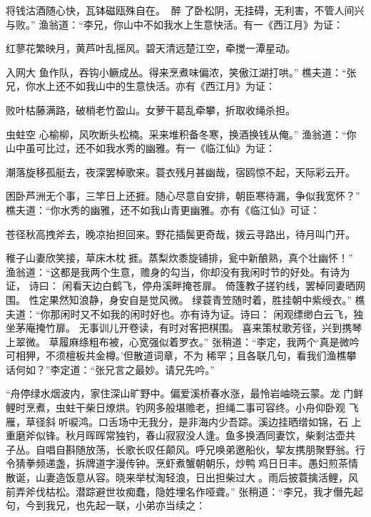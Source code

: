 将钱沽酒随心快，瓦钵磁瓯殊自在。醉
了卧松阴，无挂碍，无利害，不管人间兴与败。”
渔翁道：“李兄，你山中不如我水上生意快活。有一《西江月》为证：

红蓼花繁映月，黄芦叶乱摇风。碧天清远楚江空，牵搅一潭星动。

入网大
鱼作队，吞钩小鳜成丛。得来烹煮味偏浓，笑傲江湖打哄。”
樵夫道：“张兄，你水上还不如我山中的生意快活。亦有《西江月》为证：

败叶枯藤满路，破梢老竹盈山。女萝干葛乱牵攀，折取收绳杀担。

虫蛀空
心榆柳，风吹断头松楠。采来堆积备冬寒，换酒换钱从俺。”
渔翁道：“你山中虽可比过，还不如我水秀的幽雅。有一《临江仙》为证：

潮落旋移孤艇去，夜深罢棹歌来。蓑衣残月甚幽哉，宿鸥惊不起，天际彩云开。

困卧芦洲无个事，三竿日上还捱。随心尽意自安排，朝臣寒待漏，争似我宽怀？”
樵夫道：“你水秀的幽雅，还不如我山青更幽雅。亦有《临江仙》可证：

苍径秋高拽斧去，晚凉抬担回来。野花插鬓更奇哉，拨云寻路出，待月叫门开。

稚子山妻欣笑接，草床木枕捱。蒸梨炊黍旋铺排，瓮中新酿熟，真个壮幽怀！”
渔翁道：“这都是我两个生意，赡身的勾当，你却没有我闲时节的好处。有诗为证，
诗曰：
闲看天边白鹤飞，停舟溪畔掩苍扉。
倚篷教子搓钓线，罢棹同妻晒网围。
性定果然知浪静，身安自是觉风微。
绿蓑青笠随时着，胜挂朝中紫绶衣。”
樵夫道：“你那闲时又不如我的闲时好也。亦有诗为证。诗曰：
闲观缥缈白云飞，独坐茅庵掩竹扉。
无事训儿开卷读，有时对客把棋围。
喜来策杖歌芳径，兴到携琴上翠微。
草履麻绦粗布被，心宽强似着罗衣。”
张稍道：“李定，我两个‘真是微吟可相狎，不须檀板共金樽。’但散道词章，不为
稀罕；且各联几句，看我们渔樵攀话何如？”李定道：“张兄言之最妙。请兄先吟。”

“舟停绿水烟波内，家住深山旷野中。偏爱溪桥春水涨，最怜岩岫晓云蒙。龙
门鲜鲤时烹煮，虫蛀干柴日燎烘。钓网多般堪赡老，担绳二事可容终。小舟仰卧观
飞雁，草径斜听唳鸿。口舌场中无我分，是非海内少吾踪。溪边挂晒缯如锦，石
上重磨斧似锋。秋月晖晖常独钓，春山寂寂没人逢。鱼多换酒同妻饮，柴剩沽壶共
子丛。自唱自斟随放荡，长歌长叹任颠风。呼兄唤弟邀船伙，挈友携朋聚野翁。行
令猜拳频递盏，拆牌道字漫传钟。烹虾煮蟹朝朝乐，炒鸭鸡日日丰。愚妇煎茶情
散诞，山妻造饭意从容。晓来举杖淘轻浪，日出担柴过大。雨后披蓑擒活鲤，风
前弄斧伐枯松。潜踪避世妆痴蠢，隐姓埋名作哑聋。”
张稍道：“李兄，我才僭先起句，今到我兄，也先起一联，小弟亦当续之：

